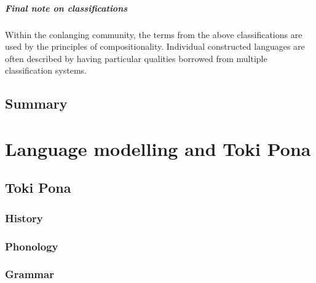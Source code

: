 \documentclass[14pt, a4paper]{extreport}
\begin{document}
        \paragraph{Final note on classifications}
Within the conlanging community, the terms from the above classifications are used by the principles of compositionality. Individual constructed languages are often described by having particular qualities borrowed from multiple classification systems.

    \section{Summary}


\chapter{Language modelling and Toki Pona}
  \section{Toki Pona}
    \subsection{History}
    \subsection{Phonology}
    \subsection{Grammar}
\end{document}
